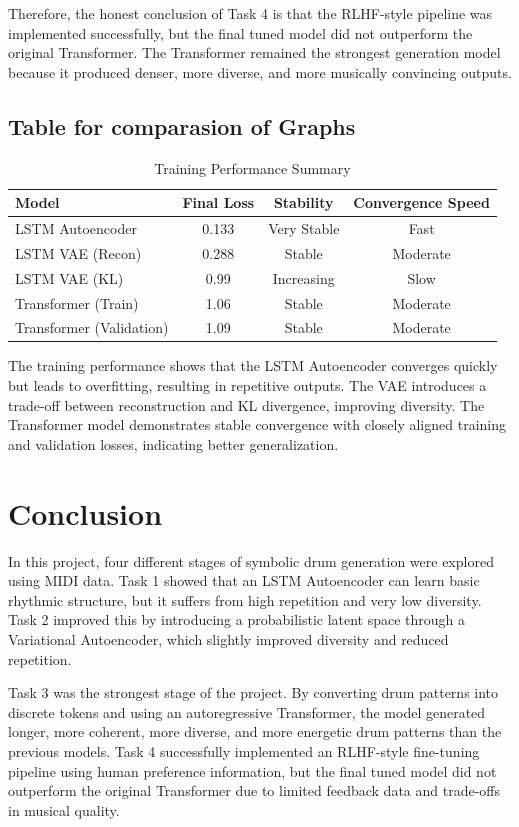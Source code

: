 \documentclass[conference]{IEEEtran}
\begin{document}
Therefore, the honest conclusion of Task 4 is that the RLHF-style pipeline was implemented successfully, but the final tuned model did not outperform the original Transformer. The Transformer remained the strongest generation model because it produced denser, more diverse, and more musically convincing outputs. 

\subsection{Table for comparasion of Graphs}
\begin{table}[h]
\centering
\caption{Training Performance Summary}
\begin{tabular}{lccc}
\hline
Model & Final Loss & Stability & Convergence Speed \\
\hline
LSTM Autoencoder & 0.133 & Very Stable & Fast \\
LSTM VAE (Recon) & 0.288 & Stable & Moderate \\
LSTM VAE (KL) & 0.99 & Increasing & Slow \\
Transformer (Train) & 1.06 & Stable & Moderate \\
Transformer (Validation) & 1.09 & Stable & Moderate \\
\hline
\end{tabular}
\end{table}
The training performance shows that the LSTM Autoencoder converges quickly but leads to overfitting, resulting in repetitive outputs. The VAE introduces a trade-off between reconstruction and KL divergence, improving diversity. The Transformer model demonstrates stable convergence with closely aligned training and validation losses, indicating better generalization.

\section{Conclusion}
In this project, four different stages of symbolic drum generation were explored using MIDI data. Task 1 showed that an LSTM Autoencoder can learn basic rhythmic structure, but it suffers from high repetition and very low diversity. Task 2 improved this by introducing a probabilistic latent space through a Variational Autoencoder, which slightly improved diversity and reduced repetition.

Task 3 was the strongest stage of the project. By converting drum patterns into discrete tokens and using an autoregressive Transformer, the model generated longer, more coherent, more diverse, and more energetic drum patterns than the previous models. Task 4 successfully implemented an RLHF-style fine-tuning pipeline using human preference information, but the final tuned model did not outperform the original Transformer due to limited feedback data and trade-offs in musical quality.
\end{document}
